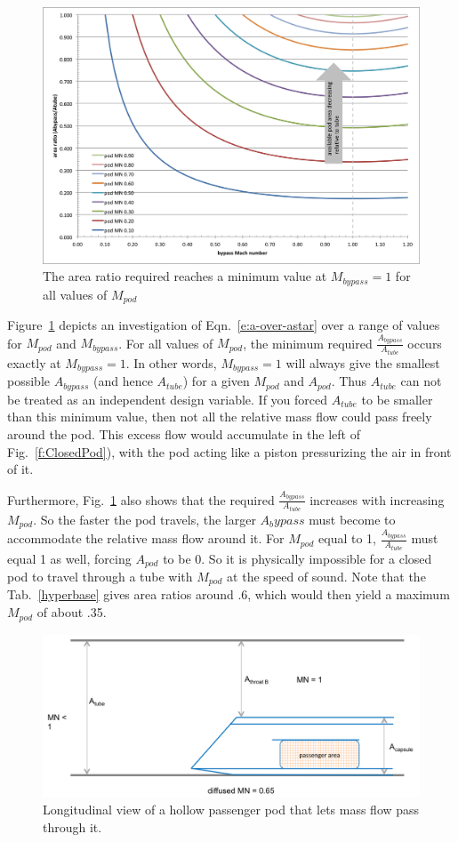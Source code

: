 \documentclass[heading.tex]{subfiles}
\begin{document}
\begin{figure}[!htb]
  \centering
  \includegraphics[width=.9\textwidth]{images/choked-flow}
  \caption{The area ratio required reaches a minimum value at $M_{bypass}=1$ for all values of $M_{pod}$}
  \label{f:choked-flow}
\end{figure}

Figure~\ref{f:choked-flow} depicts an investigation of Eqn.~\ref{e:a-over-astar} over a range of values for $M_{pod}$ and $M_{bypass}$. 
For all values of $M_{pod}$, the minimum required $\frac{A_{bypass}}{A_{tube}}$ occurs exactly at $M_{bypass}=1$. In other words, 
$M_{bypass}=1$ will always give the smallest possible $A_{bypass}$ (and hence $A_{tube}$) for a given 
$M_{pod}$ and $A_{pod}$. Thus $A_{tube}$ can not be treated as an independent design variable. If you forced $A_{tube}$ to be
smaller than this minimum value, then not all the relative mass flow could pass freely around the pod. This excess 
flow would accumulate in the left of Fig.~\ref{f:ClosedPod}), with the pod acting like a piston pressurizing the 
air in front of it. 

Furthermore, Fig.~\ref{f:choked-flow} also shows that the required $\frac{A_{bypass}}{A_{tube}}$ 
increases with increasing $M_{pod}$. So the faster the pod travels, the larger $A_bypass$ 
must become to accommodate the relative mass flow around it. For $M_{pod}$ equal to 1, $\frac{A_{bypass}}{A_{tube}}$ must 
equal 1 as well, forcing $A_{pod}$ to be 0. So it is physically impossible for a closed pod to travel through a 
tube with $M_{pod}$ at the speed of sound. Note that the Tab.~\ref{hyperbase} gives area ratios around .6, 
which would then yield a maximum $M_{pod}$ of about .35. 

\begin{figure}[hbtp]
\centering
\includegraphics[width=.85\textwidth]{images/closedCapsule}
\caption{Longitudinal view of a hollow passenger pod that lets mass flow pass through it.}
\label{f:hollowPod}
\end{figure}
\end{document}
